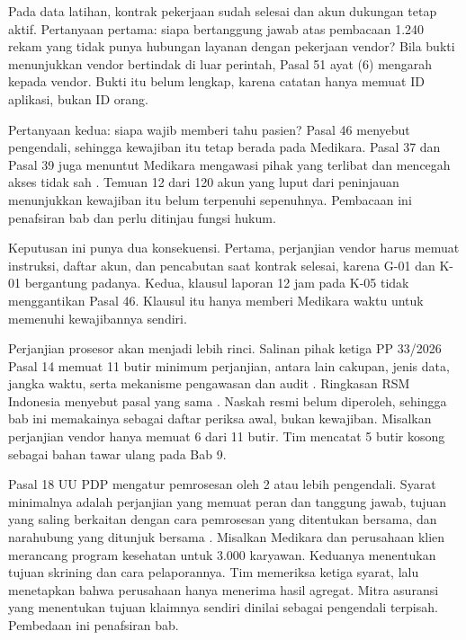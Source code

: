 \begin{kasus}[title={Kasus Medikara Health: Akun Dukungan di Luar Penugasan}]
Pada data latihan, kontrak pekerjaan sudah selesai dan akun dukungan tetap aktif. Pertanyaan
pertama: siapa bertanggung jawab atas pembacaan 1.240 rekam yang tidak punya hubungan layanan dengan
pekerjaan vendor? Bila bukti menunjukkan vendor bertindak di luar perintah, Pasal 51 ayat (6)
mengarah kepada vendor. Bukti itu belum lengkap, karena catatan hanya memuat ID aplikasi, bukan ID
orang.

Pertanyaan kedua: siapa wajib memberi tahu pasien? Pasal 46 menyebut pengendali, sehingga kewajiban
itu tetap berada pada Medikara. Pasal 37 dan Pasal 39 juga menuntut Medikara mengawasi pihak yang
terlibat dan mencegah akses tidak sah \cite{uu27-2022-pdp}. Temuan 12 dari 120 akun yang luput dari
peninjauan menunjukkan kewajiban itu belum terpenuhi sepenuhnya. Pembacaan ini penafsiran bab dan
perlu ditinjau fungsi hukum.

Keputusan ini punya dua konsekuensi. Pertama, perjanjian vendor harus memuat instruksi, daftar akun,
dan pencabutan saat kontrak selesai, karena G-01 dan K-01 bergantung padanya. Kedua, klausul laporan
12 jam pada K-05 tidak menggantikan Pasal 46. Klausul itu hanya memberi Medikara waktu untuk
memenuhi kewajibannya sendiri.
\end{kasus}

Perjanjian prosesor akan menjadi lebih rinci. Salinan pihak ketiga PP 33/2026 Pasal 14 memuat 11
butir minimum perjanjian, antara lain cakupan, jenis data, jangka waktu, serta mekanisme pengawasan
dan audit \cite{c03-pp33-nonresmi}. Ringkasan RSM Indonesia menyebut pasal yang sama
\cite{c07-rsm-pp33}. Naskah resmi belum diperoleh, sehingga bab ini memakainya sebagai daftar
periksa awal, bukan kewajiban. Misalkan perjanjian vendor hanya memuat 6 dari 11 butir. Tim mencatat
5 butir kosong sebagai bahan tawar ulang pada Bab 9.

Pasal 18 UU PDP mengatur pemrosesan oleh 2 atau lebih pengendali. Syarat minimalnya adalah
perjanjian yang memuat peran dan tanggung jawab, tujuan yang saling berkaitan dengan cara pemrosesan
yang ditentukan bersama, dan narahubung yang ditunjuk bersama \cite{uu27-2022-pdp}. Misalkan
Medikara dan perusahaan klien merancang program kesehatan untuk 3.000 karyawan. Keduanya menentukan
tujuan skrining dan cara pelaporannya. Tim memeriksa ketiga syarat, lalu menetapkan bahwa perusahaan
hanya menerima hasil agregat. Mitra asuransi yang menentukan tujuan klaimnya sendiri dinilai sebagai
pengendali terpisah. Pembedaan ini penafsiran bab.

